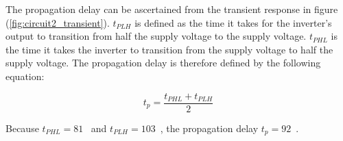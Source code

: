 The propagation delay can be ascertained from the transient response in figure (\ref{fig:circuit2_transient}). $t_{PLH}$ is defined as the time it takes for the inverter's output to transition from half the supply voltage to the supply voltage. $t_{PHL}$ is the time it takes the inverter to transition from the supply voltage to half the supply voltage. The propagation delay is therefore defined by the following equation:
 
\begin{equation}
	\label{eq:prop_delay}
	t_{p} = \frac{t_{PHL} + t_{PLH}}{2}
\end{equation}

Because $t_{PHL} = 81$\si{\pico\seconds} and $t_{PLH} = 103$\si{\pico\seconds}, the propagation delay $t_p = 92$\si{\pico\seconds}.
